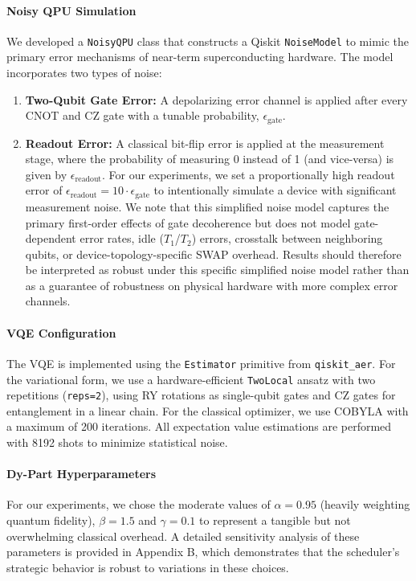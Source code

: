 \documentclass[pdflatex,sn-mathphys-num]{sn-jnl}
\theoremstyle{thmstyleone}
\theoremstyle{thmstyletwo}%
\theoremstyle{thmstylethree}%
\begin{document}
\paragraph{Noisy QPU Simulation} We developed a \texttt{NoisyQPU} class that constructs a Qiskit \texttt{NoiseModel} to mimic the primary error mechanisms of near-term superconducting hardware. The model incorporates two types of noise:
\begin{enumerate}
    \item \textbf{Two-Qubit Gate Error:} A depolarizing error channel is applied after every CNOT and CZ gate with a tunable probability, $\epsilon_{\text{gate}}$.
    \item \textbf{Readout Error:} A classical bit-flip error is applied at the measurement stage, where the probability of measuring 0 instead of 1 (and vice-versa) is given by $\epsilon_{\text{readout}}$. For our experiments, we set a proportionally high readout error of $\epsilon_{\text{readout}} = 10 \cdot \epsilon_{\text{gate}}$ to intentionally simulate a device with significant measurement noise. We note that this simplified noise model captures the primary first-order effects of gate decoherence but does not model gate-dependent error rates, idle ($T_1$/$T_2$) errors, crosstalk between neighboring qubits, or device-topology-specific SWAP overhead. Results should therefore be interpreted as robust under this specific simplified noise model rather than as a guarantee of robustness on physical hardware with more complex error channels.
\end{enumerate}

\paragraph{VQE Configuration} The VQE is implemented using the \texttt{Estimator} primitive from \texttt{qiskit\_aer}. For the variational form, we use a hardware-efficient \texttt{TwoLocal} ansatz with two repetitions (\texttt{reps=2}), using RY rotations as single-qubit gates and CZ gates for entanglement in a linear chain. For the classical optimizer, we use COBYLA with a maximum of 200 iterations. All expectation value estimations are performed with 8192 shots to minimize statistical noise.

\paragraph{Dy-Part Hyperparameters} For our experiments, we chose the moderate values of $\alpha=0.95$ (heavily weighting quantum fidelity), $\beta = 1.5$ and $\gamma = 0.1$ to represent a tangible but not overwhelming classical overhead. A detailed sensitivity analysis of these parameters is provided in Appendix B, which demonstrates that the scheduler's strategic behavior is robust to variations in these choices.
\end{document}
